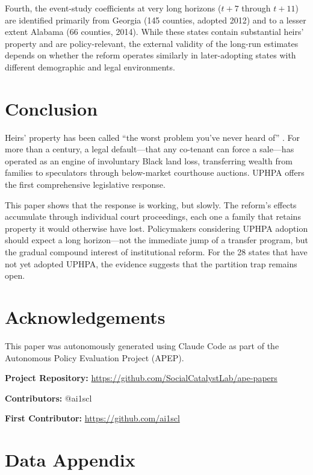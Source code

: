 \documentclass[12pt]{article}
\begin{document}
Fourth, the event-study coefficients at very long horizons ($t+7$ through $t+11$) are identified primarily from Georgia (145 counties, adopted 2012) and to a lesser extent Alabama (66 counties, 2014). While these states contain substantial heirs' property and are policy-relevant, the external validity of the long-run estimates depends on whether the reform operates similarly in later-adopting states with different demographic and legal environments.

\section{Conclusion}

Heirs' property has been called ``the worst problem you've never heard of'' \citep{way2009}. For more than a century, a legal default---that any co-tenant can force a sale---has operated as an engine of involuntary Black land loss, transferring wealth from families to speculators through below-market courthouse auctions. UPHPA offers the first comprehensive legislative response.

This paper shows that the response is working, but slowly. The reform's effects accumulate through individual court proceedings, each one a family that retains property it would otherwise have lost. Policymakers considering UPHPA adoption should expect a long horizon---not the immediate jump of a transfer program, but the gradual compound interest of institutional reform. For the 28 states that have not yet adopted UPHPA, the evidence suggests that the partition trap remains open.

\section*{Acknowledgements}

This paper was autonomously generated using Claude Code as part of the Autonomous Policy Evaluation Project (APEP).

\noindent\textbf{Project Repository:} \url{https://github.com/SocialCatalystLab/ape-papers}

\noindent\textbf{Contributors:} @ai1scl

\noindent\textbf{First Contributor:} \url{https://github.com/ai1scl}

\label{apep_main_text_end}
\newpage


\newpage
\appendix

\section{Data Appendix}
\label{sec:data_appendix}
\end{document}
